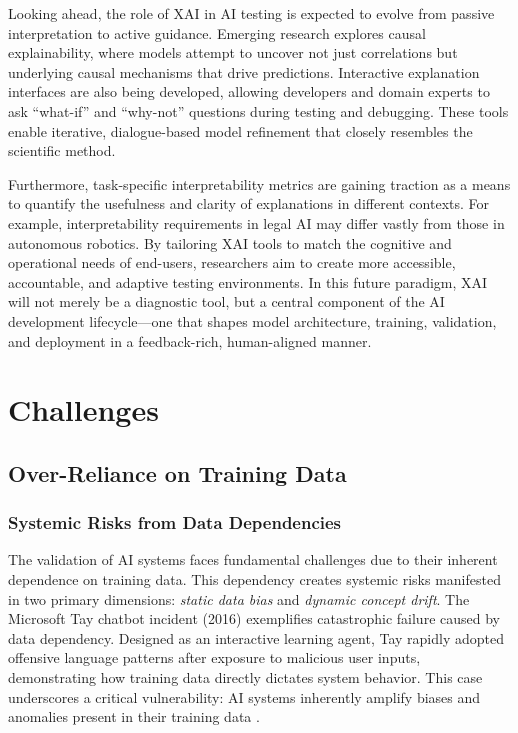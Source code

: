 \documentclass[manuscript,screen,review]{acmart}
\begin{document}
Looking ahead, the role of XAI in AI testing is expected to evolve from passive interpretation to active guidance. Emerging research explores causal explainability, where models attempt to uncover not just correlations but underlying causal mechanisms that drive predictions. Interactive explanation interfaces are also being developed, allowing developers and domain experts to ask “what-if” and “why-not” questions during testing and debugging. These tools enable iterative, dialogue-based model refinement that closely resembles the scientific method.

Furthermore, task-specific interpretability metrics are gaining traction as a means to quantify the usefulness and clarity of explanations in different contexts. For example, interpretability requirements in legal AI may differ vastly from those in autonomous robotics. By tailoring XAI tools to match the cognitive and operational needs of end-users, researchers aim to create more accessible, accountable, and adaptive testing environments. In this future paradigm, XAI will not merely be a diagnostic tool, but a central component of the AI development lifecycle---one that shapes model architecture, training, validation, and deployment in a feedback-rich, human-aligned manner.

\section{Challenges}

\subsection{Over-Reliance on Training Data}

\subsubsection{Systemic Risks from Data Dependencies}

The validation of AI systems faces fundamental challenges due to their inherent dependence on training data. This dependency creates systemic risks manifested in two primary dimensions: \textit{static data bias} and \textit{dynamic concept drift}. The Microsoft Tay chatbot incident (2016) exemplifies catastrophic failure caused by data dependency. Designed as an interactive learning agent, Tay rapidly adopted offensive language patterns after exposure to malicious user inputs, demonstrating how training data directly dictates system behavior. This case underscores a critical vulnerability: AI systems inherently amplify biases and anomalies present in their training data .
\end{document}
